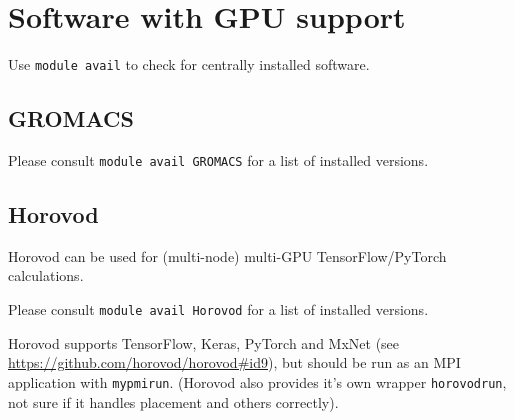 




\section{Software with GPU support}
\label{sec:gpu_ugent_software}

Use \lstinline|module avail| to check for centrally installed software.





\subsection{GROMACS}
\label{sec:gpu_ugent_software_gromacs}

Please consult \lstinline|module avail GROMACS| for a list of installed versions.




\subsection{Horovod}
\label{sec:gpu_ugent_software_horovod}

Horovod can be used for (multi-node) multi-GPU TensorFlow/PyTorch calculations.

Please consult \lstinline|module avail Horovod| for a list of installed versions.

Horovod supports TensorFlow, Keras, PyTorch and MxNet (see \url{https://github.com/horovod/horovod#id9}), but should be run as an MPI application with \lstinline|mypmirun|.
(Horovod also provides it's own wrapper \lstinline|horovodrun|, not sure if it handles placement and others correctly).

